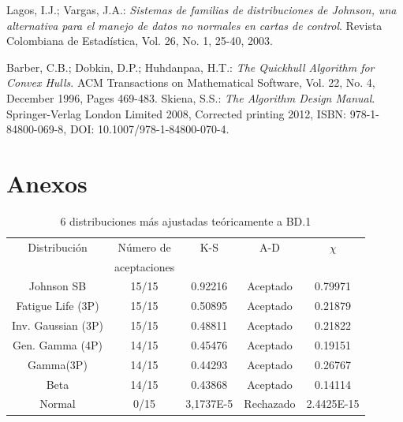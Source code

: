 \documentclass[12pt]{report}
\begin{document}
\begin{thebibliography}{9}
{		Lagos, I.J.; Vargas, J.A.:\textit{ Sistemas de familias de distribuciones de Johnson, una alternativa para el manejo de datos no normales en cartas de control}. Revista Colombiana de  Estadística, Vol. 26, No. 1,
		25-40, 2003.
		
		Barber, C.B.; Dobkin, D.P.; Huhdanpaa, H.T.:\textit{ The Quickhull Algorithm for Convex Hulls}. ACM Transactions on Mathematical Software, Vol. 22, No. 4, December 1996, Pages 469-483.
		Skiena, S.S.: \textit{The Algorithm Design Manual}. Springer-Verlag London Limited 2008, Corrected printing 2012, ISBN: 978-1-84800-069-8, DOI: 10.1007/978-1-84800-070-4.
}
\end{thebibliography}


\appendix
\chapter{Anexos}
\begin{table}[h!]
	\centering
		\caption{6 distribuciones más ajustadas teóricamente a BD.1}
	\begin{tabular}{|c|c|c|c|c|}			
											\hline
		Distribución	  &Número de	&K-S	&A-D	& $\chi$  \\
						  &	aceptaciones &     &	 &     \\ \hline
		   Johnson SB     &    15/15    & 0.92216   & 	Aceptado     &0.79971    \\ \hline
		Fatigue Life (3P) &    15/15	& 0.50895    &  Aceptado   	& 0.21879   \\ \hline
		Inv. Gaussian (3P)&    15/15	& 0.48811  	&  Aceptado 	&   0.21822 	\\ \hline 
		Gen. Gamma (4P)   &    14/15	& 0.45476   &   Aceptado	& 0.19151   	\\ \hline
		Gamma(3P)         &   14/15	&     0.44293   &      	Aceptado   &  0.26767  	\\ \hline
		Beta              &   14/15	& 0.43868     &   	Aceptado	& 0.14114    	\\ \hline
				Normal   &   0/15	& 3,1737E-5   &   	Rechazado	& 2.4425E-15	\\ \hline  %
	\end{tabular}

	\label{teo_BD1}
\end{table}
\end{document}

